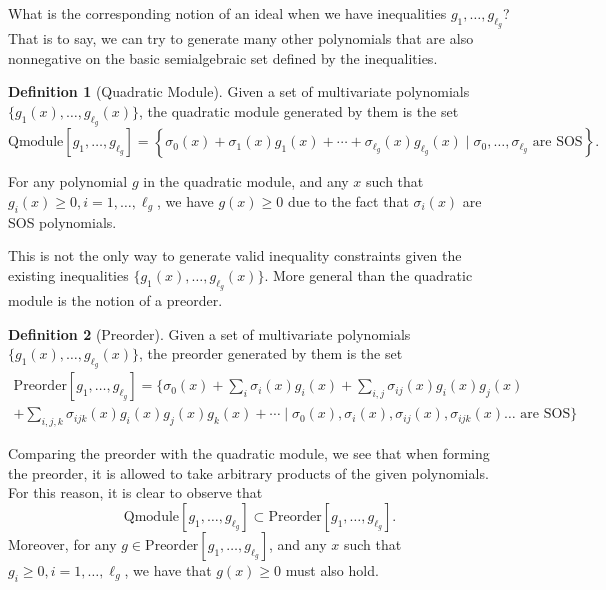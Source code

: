 \documentclass[
]{book}
\theoremstyle{definition}
\newtheorem{definition}{Definition}[chapter]
\theoremstyle{definition}
\theoremstyle{definition}
\theoremstyle{definition}
\theoremstyle{remark}
\begin{document}
What is the corresponding notion of an ideal when we have inequalities \(g_1,\dots,g_{\ell_g}\)? That is to say, we can try to generate many other polynomials that are also nonnegative on the basic semialgebraic set defined by the inequalities.

\begin{definition}[Quadratic Module]
\protect\hypertarget{def:QuadraticModule}{}\label{def:QuadraticModule}Given a set of multivariate polynomials \(\{ g_1(x),\dots,g_{\ell_g}(x) \}\), the quadratic module generated by them is the set
\[
\mathrm{Qmodule}[g_1,\dots,g_{\ell_g}] =  \left\{  \sigma_0(x) + \sigma_1(x)g_1(x) + \cdots + \sigma_{\ell_g}(x) g_{\ell_g}(x) \mid \sigma_0,\dots,\sigma_{\ell_g} \text{ are SOS}  \right\} .
\]
\end{definition}

For any polynomial \(g\) in the quadratic module, and any \(x\) such that \(g_i(x) \geq 0,i=1,\dots,\ell_g\), we have \(g(x) \geq 0\) due to the fact that \(\sigma_i(x)\) are SOS polynomials.

This is not the only way to generate valid inequality constraints given the existing inequalities \(\{ g_1(x),\dots,g_{\ell_g}(x) \}\). More general than the quadratic module is the notion of a preorder.

\begin{definition}[Preorder]
\protect\hypertarget{def:Preorder}{}\label{def:Preorder}Given a set of multivariate polynomials \(\{ g_1(x),\dots,g_{\ell_g}(x) \}\), the preorder generated by them is the set
\begin{equation}
\begin{split}
\mathrm{Preorder}[g_1,\dots,g_{\ell_g}] = \{ \sigma_0(x) + \sum_{i} \sigma_i(x) g_i(x) +  \sum_{i,j} \sigma_{ij}(x) g_i(x) g_j(x) \\
 + \sum_{i,j,k} \sigma_{ijk}(x) g_i(x) g_j(x) g_k(x) + \cdots \mid \sigma_0(x),\sigma_i(x),\sigma_{ij}(x),\sigma_{ijk}(x)\dots \text{ are SOS} \}
\end{split}
\end{equation}
\end{definition}

Comparing the preorder with the quadratic module, we see that when forming the preorder, it is allowed to take arbitrary products of the given polynomials. For this reason, it is clear to observe that
\[
\mathrm{Qmodule}[g_1,\dots,g_{\ell_g}] \subset \mathrm{Preorder}[g_1,\dots,g_{\ell_g}].
\]
Moreover, for any \(g \in \mathrm{Preorder}[g_1,\dots,g_{\ell_g}]\), and any \(x\) such that \(g_i \geq 0, i=1,\dots,\ell_g\), we have that \(g(x) \geq 0\) must also hold.
\end{document}
